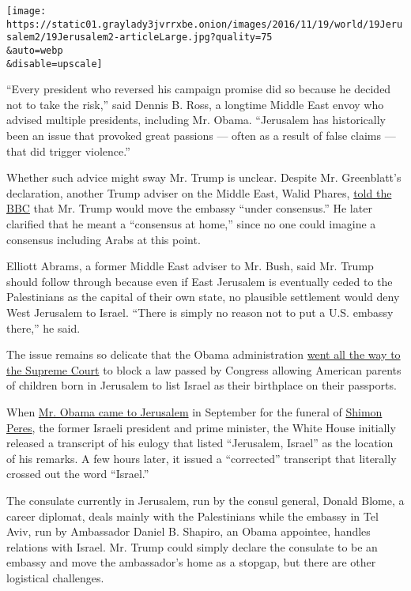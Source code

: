 \texttt{[image: https://static01.graylady3jvrrxbe.onion/images/2016/11/19/world/19Jerusalem2/19Jerusalem2-articleLarge.jpg?quality=75\\\&auto=webp\\\&disable=upscale]}

``Every president who reversed his campaign promise did so because he
decided not to take the risk,'' said Dennis B. Ross, a longtime Middle
East envoy who advised multiple presidents, including Mr. Obama.
``Jerusalem has historically been an issue that provoked great passions
--- often as a result of false claims --- that did trigger violence.''

Whether such advice might sway Mr. Trump is unclear. Despite Mr.
Greenblatt's declaration, another Trump adviser on the Middle East,
Walid Phares,
\href{https://soundcloud.com/user-735086019/walid-phares}{told the BBC}
that Mr. Trump would move the embassy ``under consensus.'' He later
clarified that he meant a ``consensus at home,'' since no one could
imagine a consensus including Arabs at this point.

Elliott Abrams, a former Middle East adviser to Mr. Bush, said Mr. Trump
should follow through because even if East Jerusalem is eventually ceded
to the Palestinians as the capital of their own state, no plausible
settlement would deny West Jerusalem to Israel. ``There is simply no
reason not to put a U.S. embassy there,'' he said.

The issue remains so delicate that the Obama administration
\href{http://www.nytimes3xbfgragh.onion/2015/06/09/us/politics/supreme-court-backs-white-house-on-jerusalem-passport-dispute.html?_r=0}{went
all the way to the Supreme Court} to block a law passed by Congress
allowing American parents of children born in Jerusalem to list Israel
as their birthplace on their passports.

When
\href{http://www.nytimes3xbfgragh.onion/2016/10/01/world/middleeast/shimon-peres-funeral.html}{Mr.
Obama came to Jerusalem} in September for the funeral of
\href{http://www.nytimes3xbfgragh.onion/topic/person/shimon-peres?inline=nyt-per}{Shimon
Peres}, the former Israeli president and prime minister, the White House
initially released a transcript of his eulogy that listed ``Jerusalem,
Israel'' as the location of his remarks. A few hours later, it issued a
``corrected'' transcript that literally crossed out the word ``Israel.''

The consulate currently in Jerusalem, run by the consul general, Donald
Blome, a career diplomat, deals mainly with the Palestinians while the
embassy in Tel Aviv, run by Ambassador Daniel B. Shapiro, an Obama
appointee, handles relations with Israel. Mr. Trump could simply declare
the consulate to be an embassy and move the ambassador's home as a
stopgap, but there are other logistical challenges.

